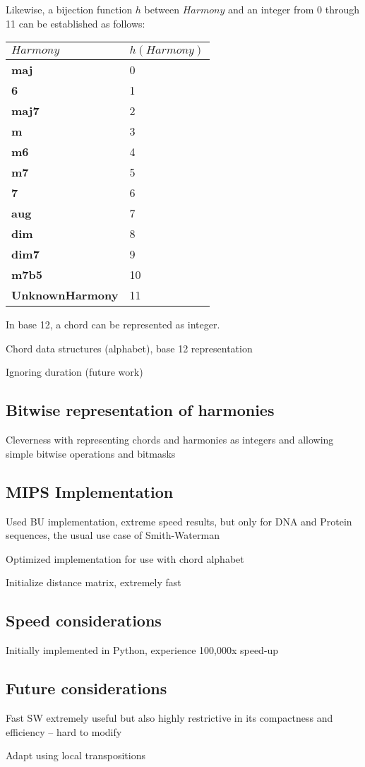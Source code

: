 Likewise, a bijection function $h$ between $Harmony$ and an integer from 0 through 11 can be established as follows:

\begin{tabular}{ll}
\toprule
$Harmony$ & $h(Harmony)$ \\
\midrule

\textbf{maj} & 0 \\
\textbf{6} & 1 \\
\textbf{maj7} & 2 \\
\textbf{m} & 3 \\
\textbf{m6} & 4 \\
\textbf{m7} & 5 \\
\textbf{7} & 6 \\
\textbf{aug} & 7 \\
\textbf{dim} & 8 \\
\textbf{dim7} & 9 \\
\textbf{m7b5} & 10 \\
\textbf{UnknownHarmony} & 11 \\
\bottomrule
\end{tabular}

In base 12, a chord can be represented as integer.

\item Chord data structures (alphabet), base 12 representation

\item Ignoring duration (future work)

\subsection{Bitwise representation of harmonies}

\item Cleverness with representing chords and harmonies as integers and allowing simple bitwise operations and bitmasks

\subsection{MIPS Implementation}

\item Used BU implementation, extreme speed results, but only for DNA and Protein sequences, the usual use case of Smith-Waterman

\item Optimized implementation for use with chord alphabet

\item Initialize distance matrix, extremely fast

\subsection{Speed considerations}

\item Initially implemented in Python, experience 100,000x speed-up

\subsection{Future considerations}

\item Fast SW extremely useful but also highly restrictive in its compactness and efficiency -- hard to modify

\item Adapt using local transpositions